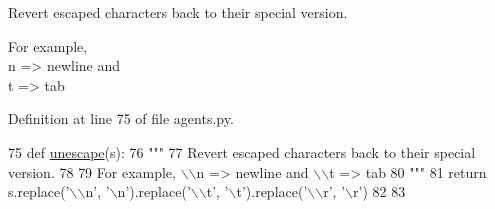 \begin{DoxyVerb}Revert escaped characters back to their special version.

For example, \\n => newline and \\t => tab
\end{DoxyVerb}
 

Definition at line 75 of file agents.\+py.


\begin{DoxyCode}
75 \textcolor{keyword}{def }\hyperlink{namespaceparlai_1_1tasks_1_1vqa__v1_1_1agents_ab44e9835e0cedea3719e3baebfe0e94b}{unescape}(s):
76     \textcolor{stringliteral}{"""}
77 \textcolor{stringliteral}{    Revert escaped characters back to their special version.}
78 \textcolor{stringliteral}{}
79 \textcolor{stringliteral}{    For example, \(\backslash\)\(\backslash\)n => newline and \(\backslash\)\(\backslash\)t => tab}
80 \textcolor{stringliteral}{    """}
81     \textcolor{keywordflow}{return} s.replace(\textcolor{stringliteral}{'\(\backslash\)\(\backslash\)n'}, \textcolor{stringliteral}{'\(\backslash\)n'}).replace(\textcolor{stringliteral}{'\(\backslash\)\(\backslash\)t'}, \textcolor{stringliteral}{'\(\backslash\)t'}).replace(\textcolor{stringliteral}{'\(\backslash\)\(\backslash\)r', '}\(\backslash\)r')
82 
83 
\end{DoxyCode}
